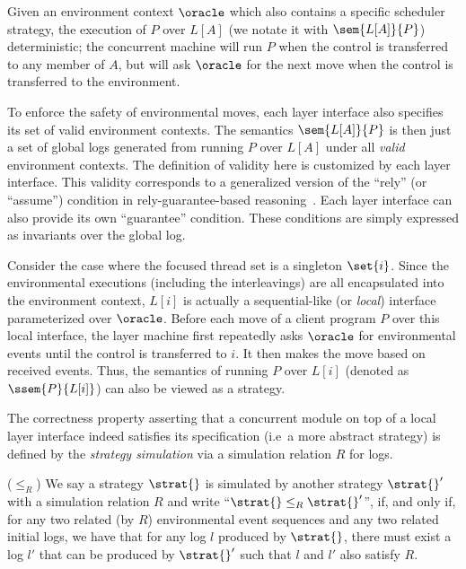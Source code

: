 Given an environment context $\oracle$ which also contains a specific
scheduler strategy, the execution of $P$ over $L[A]$ (we notate it with $\sem{L[A]}{P}$)
deterministic; the concurrent machine will run $P$ when the control is
transferred to any member of $A$, but will ask $\oracle$ for the next
move when the control is transferred to the environment.

To enforce the safety of environmental moves,
each layer interface also specifies its set of valid environment contexts.
The semantics $\sem{L[A]}{P}$ is then just a set of global logs
generated from running $P$ over $L[A]$ under all {\em valid}
environment contexts. 
The definition of validity here is customized
by each layer interface.
This validity  corresponds to a generalized version of
the ``rely'' (or ``assume'') condition in rely-guarantee-based
reasoning~\cite{feng07:sagl,vafeiadis:marriage,LRG,fu10:roch,sergey15}. Each layer interface can also
provide its own ``guarantee'' condition. These conditions  are simply expressed as
invariants over the global log. 


Consider the case where the focused thread set is a singleton $\set{i}$.
Since the environmental executions (including the interleavings) are all encapsulated into the environment
context,  $L[i]$ is actually a sequential-like (or \emph{local}) interface parameterized over $\oracle$. 
Before each move of a client program $P$ over this local interface, 
the layer machine first repeatedly asks $\oracle$ for environmental events until the control is transferred to $i$. It then makes the move based on
received events. Thus, the semantics of running $P$ over $L[i]$ (denoted as $\ssem{P}{L[i]}$) can also be viewed
as a strategy.

The correctness property asserting that a concurrent module on top of a local layer interface indeed
satisfies its specification (i.e\, a more abstract strategy) is defined
by the \emph{strategy simulation} via a simulation relation $R$ for logs.

\begin{definition}($\le_R$) We say a strategy $\strat{}$ is simulated by
another strategy $\strat{}'$ with a simulation relation $R$ and write ``$\strat{} \le_R \strat{}'$'', if, and only if, for any two related (by $R$) environmental event sequences and any two related initial logs, we have that
for any log $l$ produced by $\strat{}$, there must exist a log $l'$ that can be produced by $\strat{}'$ such that $l$ and $l'$ also satisfy $R$.
\end{definition}

